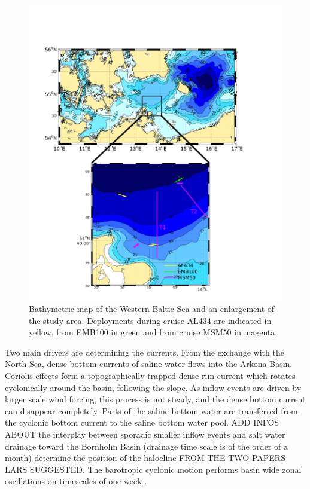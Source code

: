  \begin{figure}[ht]
 \centering
\includegraphics[width=18cm]{bilder/studyarea.pdf}
 \caption{Bathymetric map of the Western Baltic Sea and an enlargement of the 
study area. Deployments during cruise AL434 are indicated in yellow, from 
EMB100 in green and from cruise MSM50 in magenta.}
 \label{studyarea}
 \end{figure}

Two main drivers are determining the currents. From the exchange with the North 
Sea, dense bottom currents of saline water flows into the Arkona Basin. 
Coriolis effects form a topographically trapped dense rim current which rotates 
cyclonically around the basin, following the slope. As inflow events are 
driven by larger scale wind forcing, this process is not steady, and the 
dense bottom current can disappear completely. Parts of the saline bottom water 
are transferred from the cyclonic bottom current to the saline bottom water 
pool. ADD INFOS ABOUT the interplay between sporadic smaller inflow events and 
salt water drainage toward the Bornholm Basin (drainage time scale is of the 
order of a month) determine the position of the halocline FROM THE TWO PAPERS 
LARS SUGGESTED. The barotropic 
cyclonic motion performs basin wide zonal oscillations on timescales of one 
week \citep[][]{lass2003}.

